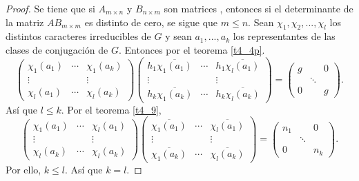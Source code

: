 \documentclass[12pt]{book}
\theoremstyle{definition}
\newcounter{in}
\begin{document}
\begin{proof}
  Se tiene que si $A_{m\times n}$ y $B_{n\times m}$ son matrices ,
  entonces si el determinante de la matriz $AB_{m\times m}$ es
  distinto de cero, se sigue que $m \leq n$.  Sean
  $\chi_{1}, \chi_{2},...,\chi_{l}$ los distintos caracteres
  irreducibles de $G$ y sean $a_{1},...,a_{k}$ los representantes de
  las clases de conjugación de $G$. Entonces por el teorema
  \ref{t4_4p}.
  \begin{equation}
    \label{eq:56}
    \begin{pmatrix}
    \chi_{1}(a_{1}) & \cdots & \chi_{1}(a_{k}) \\ 
    \vdots &  & \vdots \\
    \chi_{l}(a_{1}) & \cdots & \chi_{l}(a_{k})
  \end{pmatrix}
  \begin{pmatrix}
    h_{1} \overline{\chi_{1}(a_{1})} & \cdots & h_{1} \overline{\chi_{l}(a_{1})} \\ 
    \vdots &  & \vdots \\
    h_{k} \overline{\chi_{1}(a_{k})} & \cdots & h_{k} \overline{\chi_{l}(a_{k})}  
  \end{pmatrix}
  =
  \begin{pmatrix}
   g & & 0\\ 
     & \ddots & \\
     0 &  & g
   \end{pmatrix}
   .
  \end{equation}
  Así que $l \leq k$. Por el teorema \ref{t4_9},
  \begin{equation}
    \label{eq:57}
    \begin{pmatrix}
    \chi_{1}(a_{1}) & \cdots & \chi_{l}(a_{1}) \\ 
    \vdots &  & \vdots \\
    \chi_{l}(a_{k}) & \cdots & \chi_{l}(a_{k})
  \end{pmatrix}
  \begin{pmatrix}
     \overline{\chi_{1}(a_{1})} & \cdots &  \overline{\chi_{l}(a_{1})} \\ 
    \vdots &  & \vdots \\
     \overline{\chi_{1}(a_{k})} & \cdots &  \overline{\chi_{l}(a_{k})}  
   \end{pmatrix}
   =
  \begin{pmatrix}
   n_{1} & & 0\\ 
     & \ddots & \\

     0 &  & n_{k}
   \end{pmatrix}
   .
  \end{equation}
Por ello, $k \leq l$. Así que $k=l$.
\end{proof}
\end{document}
